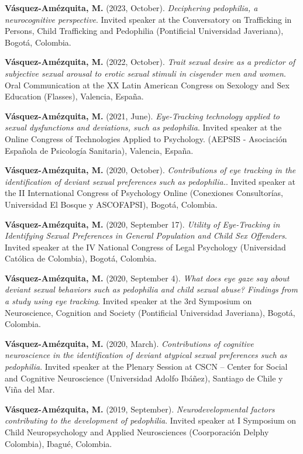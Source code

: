 \documentclass[11pt,a4paper,]{awesome-cv}
\begin{document}
\textbf{Vásquez-Amézquita, M.} (2023, October). \emph{Deciphering
pedophilia, a neurocognitive perspective}. Invited speaker at the
Conversatory on Trafficking in Persons, Child Trafficking and Pedophilia
(Pontificial Universidad Javeriana), Bogotá, Colombia.

\textbf{Vásquez-Amézquita, M.} (2022, October). \emph{Trait sexual
desire as a predictor of subjective sexual arousal to erotic sexual
stimuli in cisgender men and women}. Oral Communication at the XX Latin
American Congress on Sexology and Sex Education (Flasses), Valencia,
España.

\textbf{Vásquez-Amézquita, M.} (2021, June). \emph{Eye-Tracking
technology applied to sexual dysfunctions and deviations, such as
pedophilia}. Invited speaker at the Online Congress of Technologies
Applied to Psychology. (AEPSIS - Asociación Española de Psicología
Sanitaria), Valencia, España.

\textbf{Vásquez-Amézquita, M.} (2020, October). \emph{Contributions of
eye tracking in the identification of deviant sexual preferences such as
pedophilia.}. Invited speaker at the II International Congress of
Psychology Online (Conexiones Consultorías, Universidad El Bosque y
ASCOFAPSI), Bogotá, Colombia.

\textbf{Vásquez-Amézquita, M.} (2020, September 17). \emph{Utility of
Eye-Tracking in Identifying Sexual Preferences in General Population and
Child Sex Offenders}. Invited speaker at the IV National Congress of
Legal Psychology (Universidad Católica de Colombia), Bogotá, Colombia.

\textbf{Vásquez-Amézquita, M.} (2020, September 4). \emph{What does eye
gaze say about deviant sexual behaviors such as pedophilia and child
sexual abuse? Findings from a study using eye tracking}. Invited speaker
at the 3rd Symposium on Neuroscience, Cognition and Society (Pontificial
Universidad Javeriana), Bogotá, Colombia.

\textbf{Vásquez-Amézquita, M.} (2020, March). \emph{Contributions of
cognitive neuroscience in the identification of deviant atypical sexual
preferences such as pedophilia}. Invited speaker at the Plenary Session
at CSCN -- Center for Social and Cognitive Neuroscience (Universidad
Adolfo Ibáñez), Santiago de Chile y Viña del Mar.

\textbf{Vásquez-Amézquita, M.} (2019, September).
\emph{Neurodevelopmental factors contributing to the development of
pedophilia}. Invited speaker at I Symposium on Child Neuropsychology and
Applied Neurosciences (Coorporación Delphy Colombia), Ibagué, Colombia.
\end{document}
